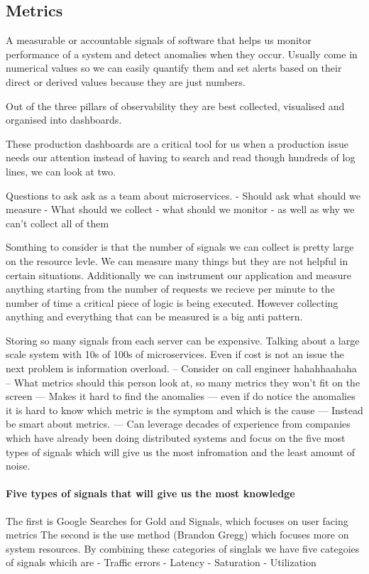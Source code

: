 \documentclass[a4paper, 11pt]{book}
\begin{document}
    \subsection{Metrics}
    A measurable or accountable signals of software that helps us monitor performance of a system and detect anomalies when they occur.
    Usually come in numerical values so we can easily quantify them and set alerts based on their direct or derived values because they are just numbers.

    Out of the three pillars of observability they are best collected, visualised and organised into dashboards.

    These production dashboards are a critical tool for us when a production issue needs our attention instead of having to search and read though hundreds of log lines, we can look at two.

    Questions to ask ask as a team about microservices.
    - Should ask what should we measure
    - What should we collect
    - what should we monitor
    - as well as why we can't collect all of them

    Somthing to consider is that the number of signals we can collect is pretty large on the resource levle.
    We can measure many things but they are not helpful in certain situations.
    Additionally we can instrument our application and measure anything starting from the number of requests we recieve per minute to the number of time a critical piece of logic is being executed.
    However collecting anything and everything that can be measured is a big anti pattern.

    Storing so many signals from each server can be expensive.
    Talking about a large scale system with 10s of 100s of microservices.
    Even if cost is not an issue the next problem is information overload.
    -- Consider on call engineer hahahhaahaha
    -- What metrics should this person look at, so many metrics they won't fit on the screen
    --- Makes it hard to find the anomalies
    --- even if do notice the anomalies it is hard to know which metric is the symptom and which is the cause
    --- Instead be smart about metrics.
    --- Can leverage decades of experience from companies which have already been doing distributed systems and focus on the five most types of signals which will give us the most infromation and the least amount of noise.

    \paragraph{Five types of signals that will give us the most knowledge}
    The first is Google Searches for Gold and Signals, which focuses on user facing metrics
    The second is the use method (Brandon Gregg) which focuses more on system resources.
    By combining these categories of singlals we have five categoies of signals whicih are
    - Traffic errors
    - Latency
    - Saturation
    - Utilization
\end{document}
